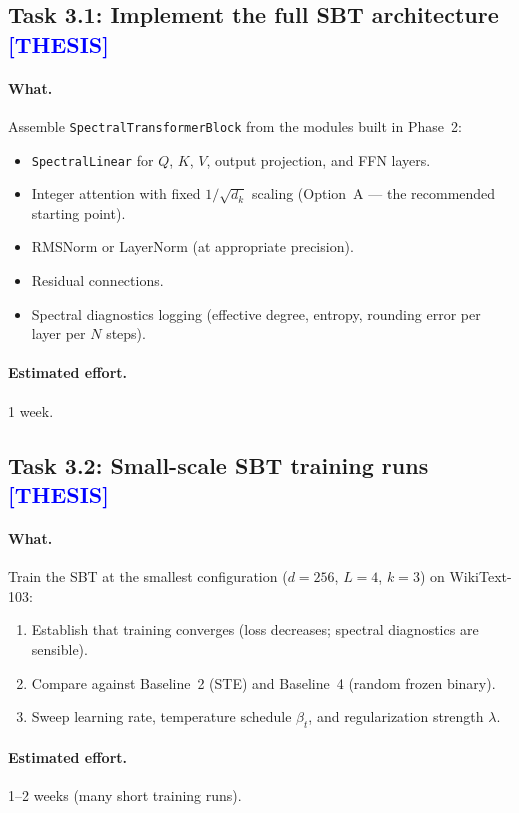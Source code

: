 \documentclass[12pt,a4paper]{article}
\newcommand{\thesis}{\texorpdfstring{\textcolor{blue}{\textbf{[THESIS]}}}{[THESIS]}}
\begin{document}
\subsection{Task 3.1: Implement the full SBT architecture \thesis}

\paragraph{What.} Assemble \texttt{SpectralTransformerBlock} from the modules built in Phase~2:
\begin{itemize}
    \item \texttt{SpectralLinear} for $Q$, $K$, $V$, output projection, and FFN layers.
    \item Integer attention with fixed $1/\sqrt{d_k}$ scaling (Option~A --- the recommended starting point).
    \item RMSNorm or LayerNorm (at appropriate precision).
    \item Residual connections.
    \item Spectral diagnostics logging (effective degree, entropy, rounding error per layer per $N$ steps).
\end{itemize}

\paragraph{Estimated effort.} 1 week.


\subsection{Task 3.2: Small-scale SBT training runs \thesis}

\paragraph{What.} Train the SBT at the smallest configuration ($d = 256$, $L = 4$, $k = 3$) on WikiText-103:
\begin{enumerate}
    \item Establish that training converges (loss decreases; spectral diagnostics are sensible).
    \item Compare against Baseline~2 (STE) and Baseline~4 (random frozen binary).
    \item Sweep learning rate, temperature schedule $\beta_t$, and regularization strength $\lambda$.
\end{enumerate}

\paragraph{Estimated effort.} 1--2 weeks (many short training runs).
\end{document}
